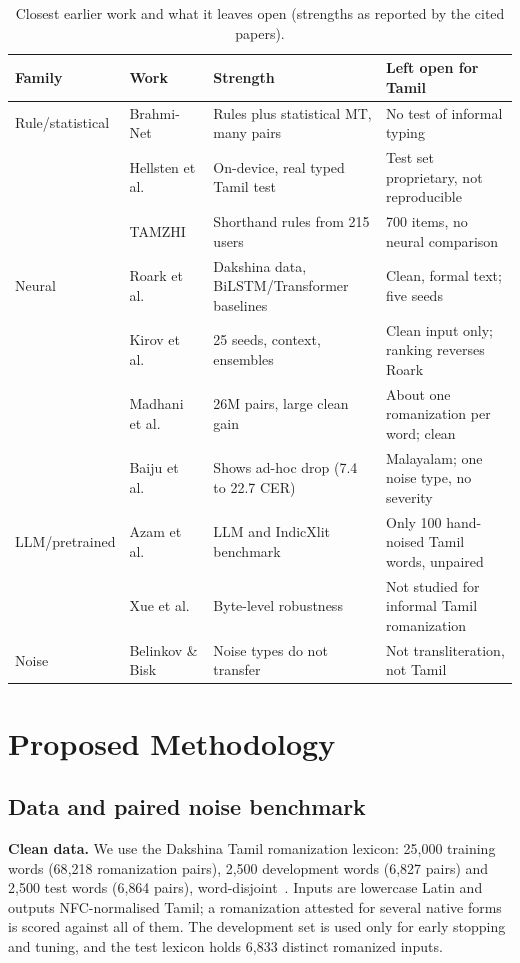 \documentclass[conference]{IEEEtran}
\begin{document}
\begin{table}[t]
\caption{Closest earlier work and what it leaves open (strengths as reported by the cited papers).}
\label{tab:related}
\centering\footnotesize
\begin{tabular}{llp{4.3cm}p{6.3cm}}
\toprule
Family & Work & Strength & Left open for Tamil \\
\midrule
Rule/statistical & Brahmi-Net~\cite{kunchukuttan2015brahminet} & Rules plus statistical MT, many pairs & No test of informal typing \\
 & Hellsten et al.~\cite{hellsten2017keyboard} & On-device, real typed Tamil test & Test set proprietary, not reproducible \\
 & TAMZHI~\cite{herath2024tamzhi} & Shorthand rules from 215 users & 700 items, no neural comparison \\
Neural & Roark et al.~\cite{roark2020dakshina} & Dakshina data, BiLSTM/Transformer baselines & Clean, formal text; five seeds \\
 & Kirov et al.~\cite{kirov2024context} & 25 seeds, context, ensembles & Clean input only; ranking reverses Roark \\
 & Madhani et al.~\cite{madhani2023aksharantar} & 26M pairs, large clean gain & About one romanization per word; clean \\
 & Baiju et al.~\cite{baiju2024malayalam} & Shows ad-hoc drop (7.4 to 22.7 CER) & Malayalam; one noise type, no severity \\
LLM/pretrained & Azam et al.~\cite{azam2025beyond} & LLM and IndicXlit benchmark & Only 100 hand-noised Tamil words, unpaired \\
 & Xue et al.~\cite{xue2022byt5} & Byte-level robustness & Not studied for informal Tamil romanization \\
Noise & Belinkov \& Bisk~\cite{belinkov2018synthetic} & Noise types do not transfer & Not transliteration, not Tamil \\
\bottomrule
\end{tabular}
\end{table}

\section{Proposed Methodology}
\label{sec:method}

\subsection{Data and paired noise benchmark}
\textbf{Clean data.}
We use the Dakshina Tamil romanization lexicon: 25{,}000 training words (68{,}218 romanization pairs), 2{,}500 development words (6{,}827 pairs) and 2{,}500 test words (6{,}864 pairs), word-disjoint~\cite{roark2020dakshina}.
Inputs are lowercase Latin and outputs NFC-normalised Tamil; a romanization attested for several native forms is scored against all of them.
The development set is used only for early stopping and tuning, and the test lexicon holds 6{,}833 distinct romanized inputs.
\end{document}
